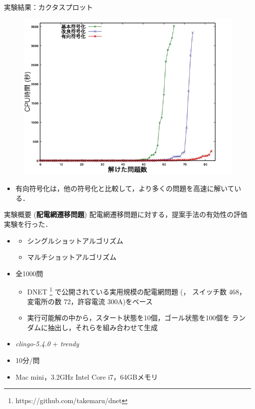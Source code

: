 \documentclass[dvipdfmx,11pt]{beamer}
\begin{document}
\begin{frame}{実験結果：カクタスプロット}
 \begin{figure}[h]
  \centering
  \includegraphics[scale=0.4]{fig/cactus.png}
 \end{figure}

\begin{itemize}
 \item 有向符号化は，他の符号化と比較して，より多くの問題を高速に解いている．
\end{itemize}\vfill
\end{frame}
\begin{frame}{実験概要 (\textbf{配電網遷移問題})}
  \renewcommand{\thefootnote}{\fnsymbol{footnote}}
  \setcounter{footnote}{1}
 配電網遷移問題に対する，提案手法の有効性の評価実験を行った．
  \vfill
  \begin{itemize}
  \item {}
    \begin{itemize}
    \item シングルショットアルゴリズム
    \item マルチショットアルゴリズム
    \end{itemize}
  \item {} 全1000問
    \begin{itemize}
    \item DNET \footnote{https://github.com/takemaru/dnet}
      で公開されている実用規模の配電網問題 (，
      スイッチ数 468，変電所の数 72，許容電流 300A)をベース
    \item 実行可能解の中から，スタート状態を10個，ゴール状態を100個を
          ランダムに抽出し，それらを組み合わせて生成
    \end{itemize}
  \item {} \textit{clingo-5.4.0} $+$ \textit{trendy}
   \item {} 10分/問
  \item {} Mac mini，3.2GHz Intel Core i7，64GBメモリ
  \end{itemize}
\end{frame}
\end{document}
